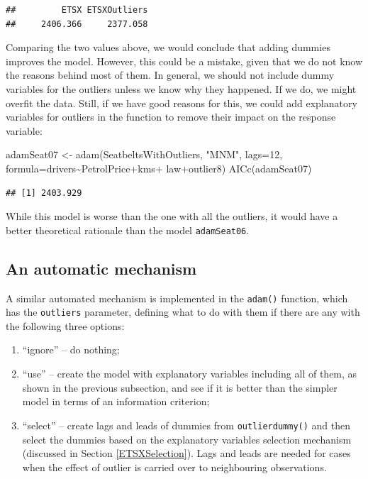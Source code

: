 \documentclass[
]{book}
\newenvironment{Shaded}{\begin{snugshade}}{\end{snugshade}}
\newcommand{\AttributeTok}[1]{\textcolor[rgb]{0.77,0.63,0.00}{#1}}
\newcommand{\DecValTok}[1]{\textcolor[rgb]{0.00,0.00,0.81}{#1}}
\newcommand{\FunctionTok}[1]{\textcolor[rgb]{0.00,0.00,0.00}{#1}}
\newcommand{\NormalTok}[1]{#1}
\newcommand{\OtherTok}[1]{\textcolor[rgb]{0.56,0.35,0.01}{#1}}
\newcommand{\SpecialCharTok}[1]{\textcolor[rgb]{0.00,0.00,0.00}{#1}}
\newcommand{\StringTok}[1]{\textcolor[rgb]{0.31,0.60,0.02}{#1}}
\providecommand{\tightlist}{%
  \setlength{\itemsep}{0pt}\setlength{\parskip}{0pt}}
\theoremstyle{definition}
\theoremstyle{definition}
\theoremstyle{definition}
\theoremstyle{definition}
\theoremstyle{remark}
\begin{document}
\begin{verbatim}
##         ETSX ETSXOutliers 
##     2406.366     2377.058
\end{verbatim}

Comparing the two values above, we would conclude that adding dummies improves the model. However, this could be a mistake, given that we do not know the reasons behind most of them. In general, we should not include dummy variables for the outliers unless we know why they happened. If we do, we might overfit the data. Still, if we have good reasons for this, we could add explanatory variables for outliers in the function to remove their impact on the response variable:

\begin{Shaded}
\begin{Highlighting}[]
\NormalTok{adamSeat07 }\OtherTok{\textless{}{-}} \FunctionTok{adam}\NormalTok{(SeatbeltsWithOutliers, }\StringTok{"MNM"}\NormalTok{, }\AttributeTok{lags=}\DecValTok{12}\NormalTok{,}
                   \AttributeTok{formula=}\NormalTok{drivers}\SpecialCharTok{\textasciitilde{}}\NormalTok{PetrolPrice}\SpecialCharTok{+}\NormalTok{kms}\SpecialCharTok{+}
\NormalTok{                     law}\SpecialCharTok{+}\NormalTok{outlier8)}
\FunctionTok{AICc}\NormalTok{(adamSeat07)}
\end{Highlighting}
\end{Shaded}

\begin{verbatim}
## [1] 2403.929
\end{verbatim}

While this model is worse than the one with all the outliers, it would have a better theoretical rationale than the model \texttt{adamSeat06}.

\hypertarget{an-automatic-mechanism}{%
\subsection{An automatic mechanism}\label{an-automatic-mechanism}}

A similar automated mechanism is implemented in the \texttt{adam()} function, which has the \texttt{outliers} parameter, defining what to do with them if there are any with the following three options:

\begin{enumerate}
\def\labelenumi{\arabic{enumi}.}
\tightlist
\item
  ``ignore'' -- do nothing;
\item
  ``use'' -- create the model with explanatory variables including all of them, as shown in the previous subsection, and see if it is better than the simpler model in terms of an information criterion;
\item
  ``select'' -- create lags and leads of dummies from \texttt{outlierdummy()} and then select the dummies based on the explanatory variables selection mechanism (discussed in Section \ref{ETSXSelection}). Lags and leads are needed for cases when the effect of outlier is carried over to neighbouring observations.
\end{enumerate}
\end{document}
